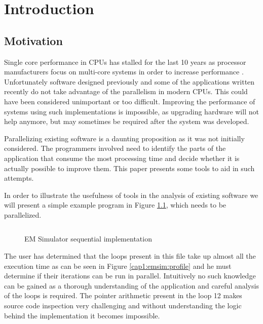 \chapter{Introduction}

\section {Motivation}

Single core performance in CPUs has stalled for the last 10 years as processor manufacturers focus on multi-core systems in order to increase performance \cite{procspeed}. Unfortunately software designed previously and some of the applications written recently do not take advantage of the parallelism in modern CPUs. This could have been considered unimportant or too difficult. Improving the performance of systems using such implementations is impossible, as upgrading hardware will not help anymore, but may sometimes be required after the system was developed.

Parallelizing existing software is a daunting proposition as it was not initially considered. The programmers involved need to identify the parts of the application that consume the most processing time and decide whether it is actually possible to improve them. This paper presents some tools to aid in such attempts.

In order to illustrate the usefulness of tools in the analysis of existing software we will present a simple example program in Figure \ref{cap1:emsim:seq}, which needs to be parallelized.

\begin{figure}
	\begin{center}
		\inputminted[linenos, fontsize=\scriptsize]{c}{emsim_seq.c}
	\end{center}
	\caption{EM Simulator sequential implementation}
	\label{cap1:emsim:seq}
\end{figure}

The user has determined that the loops present in this file take up almost all the execution time as can be seen in Figure \ref{cap1:emsim:profile} and he must determine if their iterations can be run in parallel. Intuitively no such knowledge can be gained as a thorough understanding of the application and careful analysis of the loops is required. The pointer arithmetic present in the loop 12 makes source code inspection very challenging and without understanding the logic behind the implementation it becomes impossible.

